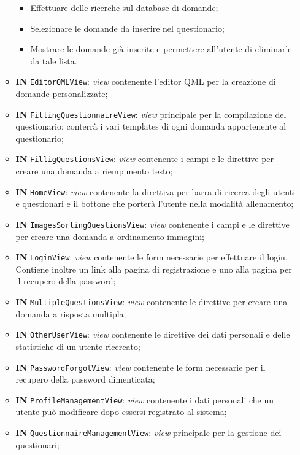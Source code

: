\begin{itemize}
\begin{itemize}
\begin{itemize}
				\item Effettuare delle ricerche sul database di domande;
				\item Selezionare le domande da inserire nel questionario;
				\item Mostrare le domande già inserite e permettere all'utente di eliminarle da tale lista.
			\end{itemize}
			\item \textbf{IN} \texttt{EditorQMLView}: \textit{view} contenente l'editor QML per la creazione di domande personalizzate;
			\item \textbf{IN} \texttt{FillingQuestionnaireView}: \textit{view} principale per la compilazione del questionario; conterrà i vari templates di ogni domanda appartenente al questionario;
			\item \textbf{IN} \texttt{FilligQuestionsView}: \textit{view} contenente i campi e le direttive per creare una domanda a riempimento testo;
			\item \textbf{IN} \texttt{HomeView}: \textit{view} contenente la direttiva per barra di ricerca degli utenti e questionari e il bottone che porterà l'utente nella modalità allenamento;
			\item \textbf{IN} \texttt{ImagesSortingQuestionsView}: \textit{view} contenente i campi e le direttive per creare una domanda a ordinamento immagini;
			\item \textbf{IN} \texttt{LoginView}: \textit{view} contenente le form necessarie per effettuare il login. Contiene inoltre un link alla pagina di registrazione e uno alla pagina per il recupero della password;
			\item \textbf{IN} \texttt{MultipleQuestionsView}: \textit{view} contenente le direttive per creare una domanda a risposta multipla;
			\item \textbf{IN} \texttt{OtherUserView}: \textit{view} contenente le direttive dei dati personali e delle statistiche di un utente ricercato;
			\item \textbf{IN} \texttt{PasswordForgotView}: \textit{view} contenente le form necessarie per il recupero della password dimenticata; 
			\item \textbf{IN} \texttt{ProfileManagementView}: \textit{view} contenente i dati personali che un utente può modificare dopo essersi registrato al sistema;
			\item \textbf{IN} \texttt{QuestionnaireManagementView}:  \textit{view} principale per la gestione dei questionari;

\end{itemize}
\end{itemize}
